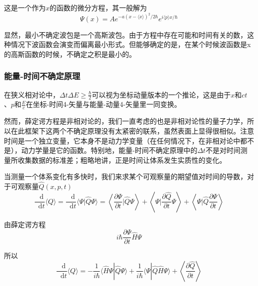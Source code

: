 \documentclass[UTF8]{ctexart}
\begin{document}
\noindent 这是一个作为$x$的函数的微分方程，其一般解为
\begin{equation}
    \Psi(x)=A e^{-a(x-\langle x\rangle)^{2} / 2 \hbar} e^{i\langle p\rangle x / \hbar}
    \end{equation}

\noindent 显然，最小不确定波包是一个高斯波包。由于方程中存在可能和时间有关的数，这种情况下波函数会演变而偏离最小形式。但能够确定的是，在某个时候波函数是x的高斯函数的时候，不确定之积是最小的。

    \subsubsection{能量-时间不确定原理}
    在狭义相对论中，$\Delta t \Delta E \ge \frac{\hbar}{2}$可以视为坐标动量版本的一个推论，这是由于$x$和$ct$、$p$和$\frac{E}{c}$在坐标-时间4-矢量与能量-动量4-矢量里一同变换。

    然而，薛定谔方程是非相对论的，我们一直考虑的也是非相对论性的量子力学，所以在此框架下这两个不确定原理没有太紧密的联系，虽然表面上显得很相似。注意时间是一个独立变量，它本身不是动力学变量（在任何情况下，在非相对论中都不是），动力学量是它的函数。特别地，能量-时间不确定原理中的$\Delta t$不是对时间测量所收集数据的标准差；粗略地讲，正是时间让体系发生实质性的变化。

    当测量一个体系变化有多快时，我们来求某个可观察量的期望值对时间的导数，对于可观察量$\hat{Q}(x,p,t)$
    \begin{equation}
        \frac{\mathop{}\!\mathrm{d} }{\mathop{}\!\mathrm{d}  t}\langle Q\rangle=\frac{\mathop{}\!\mathrm{d} }{\mathop{}\!\mathrm{d}  t}\langle\Psi | \hat{Q} \Psi\rangle=\left\langle\frac{\partial \Psi}{\partial t} | \hat{Q} \Psi\right\rangle+\left\langle\Psi | \frac{\partial \hat{Q}}{\partial t} \Psi\right\rangle+\left\langle\Psi | \hat{Q} \frac{\partial \Psi}{\partial t}\right\rangle
        \end{equation}

\noindent 由薛定谔方程
\begin{equation}
    i \hbar \frac{\partial \Psi}{\partial t} \hat{H} \Psi
\end{equation}

\noindent 所以
\begin{equation}
    \frac{\mathop{}\!\mathrm{d} }{\mathop{}\!\mathrm{d}  t}\langle Q\rangle=-\frac{1}{i \hbar}\langle\hat{H} \Psi | \hat{Q} \Psi\rangle+\frac{1}{i \hbar}\langle\Psi | \hat{Q} \hat{H} \Psi\rangle+\left\langle\frac{\partial \hat{Q}}{\partial t}\right\rangle
    \end{equation}
\end{document}
